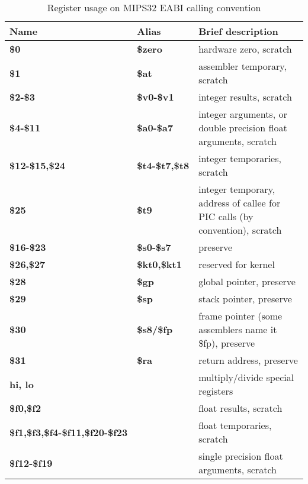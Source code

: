 \begin{table}[h]
\begin{tabular*}{0.95\textwidth}{lll}
Name                                   & Alias                & Brief description\\
\hline
{\bf \$0}                              & {\bf \$zero}         & hardware zero, scratch \\
{\bf \$1}                              & {\bf \$at}           & assembler temporary, scratch \\
{\bf \$2-\$3}                          & {\bf \$v0-\$v1}      & integer results, scratch \\
{\bf \$4-\$11}                         & {\bf \$a0-\$a7}      & integer arguments, or double precision float arguments, scratch \\
{\bf \$12-\$15,\$24}                   & {\bf \$t4-\$t7,\$t8} & integer temporaries, scratch \\
{\bf \$25}                             & {\bf \$t9}           & integer temporary, address of callee for PIC calls (by convention), scratch \\
{\bf \$16-\$23}                        & {\bf \$s0-\$s7}      & preserve \\
{\bf \$26,\$27}                        & {\bf \$kt0,\$kt1}    & reserved for kernel \\
{\bf \$28}                             & {\bf \$gp}           & global pointer, preserve \\
{\bf \$29}                             & {\bf \$sp}           & stack pointer, preserve \\
{\bf \$30}                             & {\bf \$s8/\$fp}      & frame pointer (some assemblers name it \$fp), preserve \\
{\bf \$31}                             & {\bf \$ra}           & return address, preserve \\
{\bf hi, lo}                           &                      & multiply/divide special registers \\
{\bf \$f0,\$f2}                        &                      & float results, scratch \\
{\bf \$f1,\$f3,\$f4-\$f11,\$f20-\$f23} &                      & float temporaries, scratch \\
{\bf \$f12-\$f19}                      &                      & single precision float arguments, scratch \\
\end{tabular*}
\caption{Register usage on MIPS32 EABI calling convention}
\end{table}

